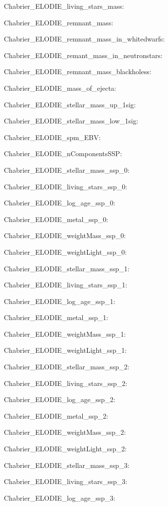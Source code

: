 \item Chabrier\_ELODIE\_living\_stars\_mass: 
\item Chabrier\_ELODIE\_remnant\_mass: 
\item Chabrier\_ELODIE\_remnant\_mass\_in\_whitedwarfs: 
\item Chabrier\_ELODIE\_remant\_mass\_in\_neutronstars: 
\item Chabrier\_ELODIE\_remnant\_mass\_blackholess: 
\item Chabrier\_ELODIE\_mass\_of\_ejecta: 
\item Chabrier\_ELODIE\_stellar\_mass\_up\_1sig: 
\item Chabrier\_ELODIE\_stellar\_mass\_low\_1sig: 
\item Chabrier\_ELODIE\_spm\_EBV: 
\item Chabrier\_ELODIE\_nComponentsSSP: 
\item Chabrier\_ELODIE\_stellar\_mass\_ssp\_0: 
\item Chabrier\_ELODIE\_living\_stars\_ssp\_0: 
\item Chabrier\_ELODIE\_log\_age\_ssp\_0: 
\item Chabrier\_ELODIE\_metal\_ssp\_0: 
\item Chabrier\_ELODIE\_weightMass\_ssp\_0: 
\item Chabrier\_ELODIE\_weightLight\_ssp\_0: 
\item Chabrier\_ELODIE\_stellar\_mass\_ssp\_1: 
\item Chabrier\_ELODIE\_living\_stars\_ssp\_1: 
\item Chabrier\_ELODIE\_log\_age\_ssp\_1: 
\item Chabrier\_ELODIE\_metal\_ssp\_1: 
\item Chabrier\_ELODIE\_weightMass\_ssp\_1: 
\item Chabrier\_ELODIE\_weightLight\_ssp\_1: 
\item Chabrier\_ELODIE\_stellar\_mass\_ssp\_2: 
\item Chabrier\_ELODIE\_living\_stars\_ssp\_2: 
\item Chabrier\_ELODIE\_log\_age\_ssp\_2: 
\item Chabrier\_ELODIE\_metal\_ssp\_2: 
\item Chabrier\_ELODIE\_weightMass\_ssp\_2: 
\item Chabrier\_ELODIE\_weightLight\_ssp\_2: 
\item Chabrier\_ELODIE\_stellar\_mass\_ssp\_3: 
\item Chabrier\_ELODIE\_living\_stars\_ssp\_3: 
\item Chabrier\_ELODIE\_log\_age\_ssp\_3: 
